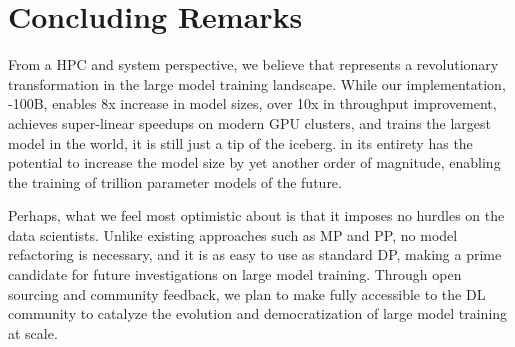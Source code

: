 \section{Concluding Remarks}
From a HPC and system perspective, we believe that \name represents a revolutionary transformation in the large model training landscape. While our implementation, \name-100B, enables 8x increase in model sizes, over 10x in throughput improvement, achieves super-linear speedups on modern GPU clusters, and trains the largest model in the world, it is still just a tip of the iceberg. \name in its entirety has the potential to increase the model size by yet another order of magnitude, enabling the training of trillion parameter models of the future. 

Perhaps, what we feel most optimistic about \name is that it imposes no hurdles on the data scientists. Unlike existing approaches such as MP and PP, no model refactoring is necessary, and it is as easy to use as standard DP, making \name a prime candidate for future investigations on large model training. Through open sourcing and community feedback, we plan to make \name fully accessible to the DL community to catalyze the evolution and democratization of large model training at scale.  